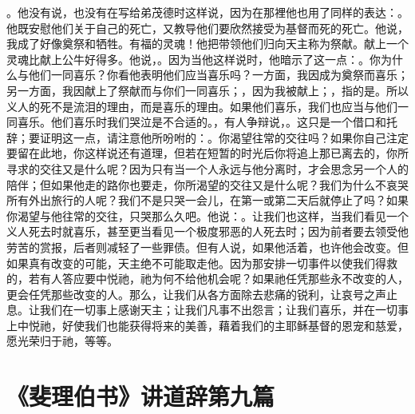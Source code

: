 。他没有说，也没有在写给弟茂德时这样说，因为在那裡他也用了同样的表达：。他既安慰他们关于自己的死亡，又教导他们要欣然接受为基督而死的死亡。他说，我成了好像奠祭和牺牲。有福的灵魂！他把带领他们归向天主称为祭献。献上一个灵魂比献上公牛好得多。他说，。因为当他这样说时，他暗示了这一点：。你为什么与他们一同喜乐？你看他表明他们应当喜乐吗？一方面，我因成为奠祭而喜乐；另一方面，我因献上了祭献而与你们一同喜乐；，因为我被献上；，指的是。所以义人的死不是流泪的理由，而是喜乐的理由。如果他们喜乐，我们也应当与他们一同喜乐。他们喜乐时我们哭泣是不合适的。，有人争辩说，。这只是一个借口和托辞；要证明这一点，请注意他所吩咐的：。你渴望往常的交往吗？如果你自己注定要留在此地，你这样说还有道理，但若在短暂的时光后你将追上那已离去的，你所寻求的交往又是什么呢？因为只有当一个人永远与他分离时，才会思念另一个人的陪伴；但如果他走的路你也要走，你所渴望的交往又是什么呢？我们为什么不哀哭所有外出旅行的人呢？我们不是只哭一会儿，在第一或第二天后就停止了吗？如果你渴望与他往常的交往，只哭那么久吧。他说：。让我们也这样，当我们看见一个义人死去时就喜乐，甚至更当看见一个极度邪恶的人死去时；因为前者要去领受他劳苦的赏报，后者则减轻了一些罪债。但有人说，如果他活着，也许他会改变。但如果真有改变的可能，天主绝不可能取走他。因为那安排一切事件以使我们得救的，若有人答应要中悦祂，祂为何不给他机会呢？如果祂任凭那些永不改变的人，更会任凭那些改变的人。那么，让我们从各方面除去悲痛的锐利，让哀号之声止息。让我们在一切事上感谢天主；让我们凡事不出怨言；让我们喜乐，并在一切事上中悦祂，好使我们也能获得将来的美善，藉着我们的主耶稣基督的恩宠和慈爱，愿光荣归于祂，等等。\par



\section{《斐理伯书》讲道辞第九篇}

